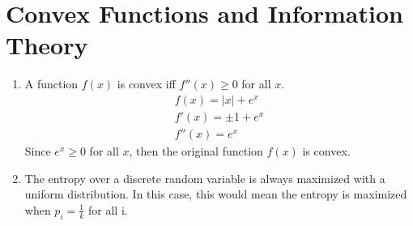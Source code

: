 \documentclass[12pt]{article}
\begin{document}
\section{Convex Functions and Information Theory}
\begin{enumerate}[label=\alph*.]
    \item A function \( f(x) \) is convex iff \( f''(x) \geq 0 \) for all \(x\).
    	\begin{gather*}
	    f(x) = |x| + e^x \\
	    f'(x) = \pm1 + e^x \\
	    f''(x) = e^x
	\end{gather*}
	Since \( e^x \geq 0 \) for all \(x\), then the original function \( f(x) \) is convex.
    \item The entropy over a discrete random variable is always maximized with a uniform distribution. In this case, this would mean the entropy is maximized when \( p_i = \frac{1}{k} \) for all i.
\end{enumerate}
\end{document}
